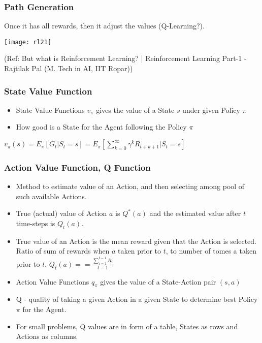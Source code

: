 \begin{frame}[fragile]\frametitle{Path Generation}

Once it has all rewards, then it adjust the values (Q-Learning?).

\begin{center}
\texttt{[image: rl21]}
\end{center}


{\tiny (Ref: But what is Reinforcement Learning? | Reinforcement Learning Part-1 - Rajtilak Pal (M. Tech in AI, IIT Ropar))}

\end{frame}

\begin{frame}[fragile]\frametitle{State Value Function}

\begin{itemize}
\item State Value Functions $v_{\pi}$ gives the value of a State $s$ under given Policy $\pi$
\item How good is a State for the Agent following the Policy $\pi$
\end{itemize}

$v_{\pi}(s) = E_{\pi}[G_t | S_t = s] = E_{\pi}[\sum_{k=0}^{\infty}\gamma^kR_{t+k+1}|S_t=s]$

\end{frame}

\begin{frame}[fragile]\frametitle{Action Value Function, Q Function}

\begin{itemize}
\item Method to estimate value of an Action, and then selecting among pool of such available Actions.
\item True (actual) value of Action $a$ is $Q^*(a)$ and the estimated value after $t$ time-steps is $Q_t(a)$.
\item True value of an Action is the mean reward given that the Action is selected. Ratio of sum of rewards when $a$ taken prior to $t$, to number of tomes a taken prior to $t$. $Q_t(a) = = \frac{\sum_{i=1}^{t-1} R_i}{t-1}$
\item Action Value Functions $q_{\pi}$ gives the value of a State-Action pair $(s,a)$ 
\item Q - quality of taking a given Action in a given State to determine best Policy $\pi$ for the Agent.
\item For small problems, Q values are in form of a table, States as rows and Actions as columns.
\end{itemize}

\end{frame}



